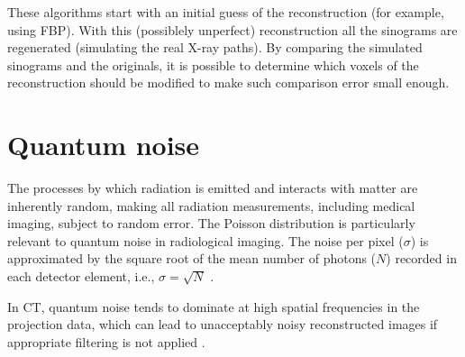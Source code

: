 \begin{enumerate}
  These algorithms start with an initial guess of the reconstruction
  (for example, using FBP). With this (possiblely unperfect)
  reconstruction all the sinograms are regenerated (simulating the
  real X-ray paths). By comparing the simulated sinograms and the
  originals, it is possible to determine which voxels of the
  reconstruction should be modified to make such comparison error
  small enough.

\end{enumerate}

\section{Quantum noise}

The processes by which radiation is emitted and interacts with matter
are inherently random, making all radiation measurements, including
medical imaging, subject to random error. The Poisson distribution is
particularly relevant to quantum noise in radiological imaging. The
noise per pixel ($\sigma$) is approximated by the square root of the
mean number of photons ($N$) recorded in each detector element, i.e.,
$\sigma = \sqrt{N}$ \cite{bushberg2011essential}.

In CT, quantum noise tends to dominate at high spatial frequencies in
the projection data, which can lead to unacceptably noisy
reconstructed images if appropriate filtering is not applied
\cite{bushberg2011essential}.

